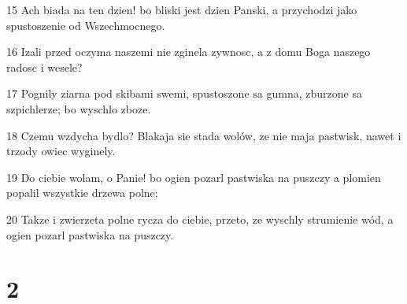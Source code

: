 \par 15 Ach biada na ten dzien! bo bliski jest dzien Panski, a przychodzi jako spustoszenie od Wszechmocnego.
\par 16 Izali przed oczyma naszemi nie zginela zywnosc, a z domu Boga naszego radosc i wesele?
\par 17 Pognily ziarna pod skibami swemi, spustoszone sa gumna, zburzone sa szpichlerze; bo wyschlo zboze.
\par 18 Czemu wzdycha bydlo? Blakaja sie stada wolów, ze nie maja pastwisk, nawet i trzody owiec wyginely.
\par 19 Do ciebie wolam, o Panie! bo ogien pozarl pastwiska na puszczy a plomien popalil wszystkie drzewa polne;
\par 20 Takze i zwierzeta polne rycza do ciebie, przeto, ze wyschly strumienie wód, a ogien pozarl pastwiska na puszczy.

\chapter{2}

